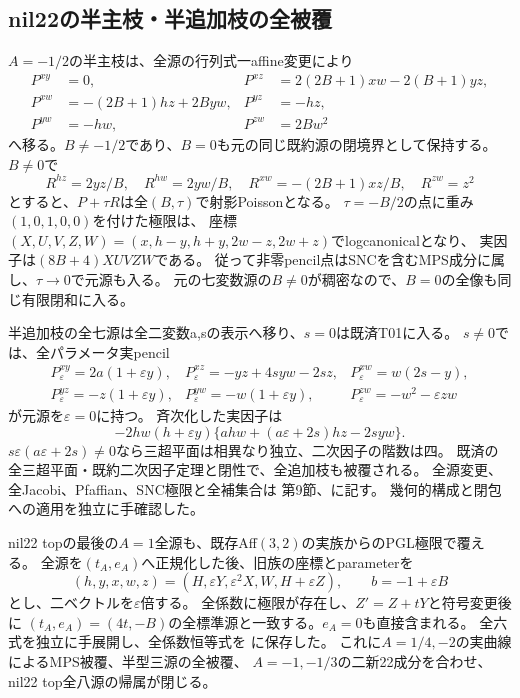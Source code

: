 \documentclass[a4paper,11pt]{ltjsarticle}
\theoremstyle{definition}
\begin{document}
\subsection{nil22の半主枝・半追加枝の全被覆}
$A=-1/2$の半主枝は、全源の行列式一affine変更により
\[
\begin{aligned}
 P^{xy}&=0,& P^{xz}&=2(2B+1)xw-2(B+1)yz,\\
 P^{xw}&=-(2B+1)hz+2Byw,&P^{yz}&=-hz,\\
 P^{yw}&=-hw,&P^{zw}&=2Bw^2
\end{aligned}
\]
へ移る。$B\ne-1/2$であり、$B=0$も元の同じ既約源の閉境界として保持する。
$B\ne0$で
\[
 R^{hz}=2yz/B,\quad R^{hw}=2yw/B,\quad
 R^{xw}=-(2B+1)xz/B,\quad R^{zw}=z^2
\]
とすると、$P+\tau R$は全$(B,\tau)$で射影Poissonとなる。
$\tau=-B/2$の点に重み$(1,0,1,0,0)$を付けた極限は、
座標$(X,U,V,Z,W)=(x,h-y,h+y,2w-z,2w+z)$でlogcanonicalとなり、
実因子は$(8B+4)XUVZW$である。
従って非零pencil点はSNCを含むMPS成分に属し、$\tau\to0$で元源も入る。
元の七変数源の$B\ne0$が稠密なので、$B=0$の全像も同じ有限閉和に入る。

半追加枝の全七源は全二変数a,sの表示へ移り、$s=0$は既済T01に入る。
$s\ne0$では、全パラメータ実pencil
\[
\begin{array}{lll}
 P_\varepsilon^{xy}=2a(1+\varepsilon y),&
 P_\varepsilon^{xz}=-yz+4syw-2sz,&P_\varepsilon^{xw}=w(2s-y),\\
 P_\varepsilon^{yz}=-z(1+\varepsilon y),&
 P_\varepsilon^{yw}=-w(1+\varepsilon y),&
 P_\varepsilon^{zw}=-w^2-\varepsilon zw
\end{array}
\]
が元源を$\varepsilon=0$に持つ。
斉次化した実因子は
\[
 -2hw(h+\varepsilon y)\{ahw+(a\varepsilon+2s)hz-2syw\}.
\]
$s\varepsilon(a\varepsilon+2s)\ne0$なら三超平面は相異なり独立、二次因子の階数は四。
既済の全三超平面・既約二次因子定理と閉性で、全追加枝も被覆される。
全源変更、全Jacobi、Pfaffian、SNC極限と全補集合は
第9節、に記す。
幾何的構成と閉包への適用を独立に手確認した。

nil22 topの最後の$A=1$全源も、既存Aff$(3,2)$の実族からのPGL極限で覆える。
全源を$(t_A,e_A)$へ正規化した後、旧族の座標とparameterを
\[
 (h,y,x,w,z)=(H,\varepsilon Y,\varepsilon^2X,W,H+\varepsilon Z),
 \qquad b=-1+\varepsilon B
\]
とし、二ベクトルを$\varepsilon$倍する。
全係数に極限が存在し、$Z'=Z+tY$と符号変更後に
$(t_A,e_A)=(4t,-B)$の全標準源と一致する。$e_A=0$も直接含まれる。
全六式を独立に手展開し、全係数恒等式を
に保存した。
これに$A=1/4,-2$の実曲線によるMPS被覆、半型三源の全被覆、
$A=-1,-1/3$の二新22成分を合わせ、nil22 top全八源の帰属が閉じる。
\end{document}
